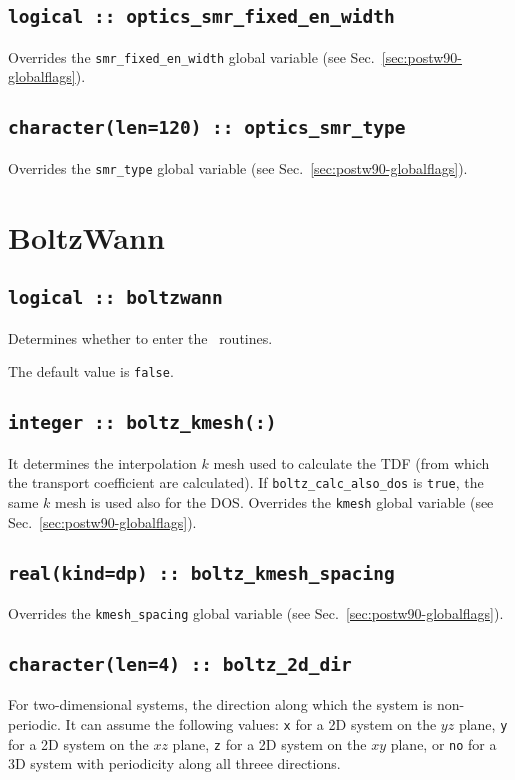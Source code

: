 \subsection[optics\_smr\_fixed\_en\_width]{\tt logical :: optics\_smr\_fixed\_en\_width}
Overrides the \verb#smr_fixed_en_width# global variable (see
Sec.~\ref{sec:postw90-globalflags}).

\subsection[optics\_smr\_type]{\tt  character(len=120) :: optics\_smr\_type}
Overrides the \verb#smr_type# global variable (see
Sec.~\ref{sec:postw90-globalflags}).

\clearpage
\section{BoltzWann}
\subsection[boltzwann]{\tt logical :: boltzwann}
Determines whether to enter the \bw\ routines.

The default value is \verb#false#.

\subsection[boltz\_kmesh]{\tt integer :: boltz\_kmesh(:)}
It determines the interpolation $k$ mesh used to calculate the TDF (from which the transport coefficient are calculated). If {\tt boltz\_calc\_also\_dos} is \verb#true#, the same $k$ mesh is used also for the DOS.
Overrides the \verb#kmesh# global variable (see
Sec.~\ref{sec:postw90-globalflags}).

\subsection[boltz\_kmesh\_spacing]{\tt real(kind=dp) :: boltz\_kmesh\_spacing}
Overrides the \verb#kmesh_spacing# global variable (see
Sec.~\ref{sec:postw90-globalflags}).

\subsection[boltz\_2d\_dir]{\tt  character(len=4) :: boltz\_2d\_dir}
\label{sec:boltz2ddir}
For two-dimensional systems, the direction along which the system is non-periodic. It can assume the following values: \texttt{x} for a 2D system on the $yz$ plane,  \texttt{y} for a 2D system on the $xz$ plane, \texttt{z} for a 2D system on the $xy$ plane, or \texttt{no} for a 3D system with periodicity along all threee directions.

